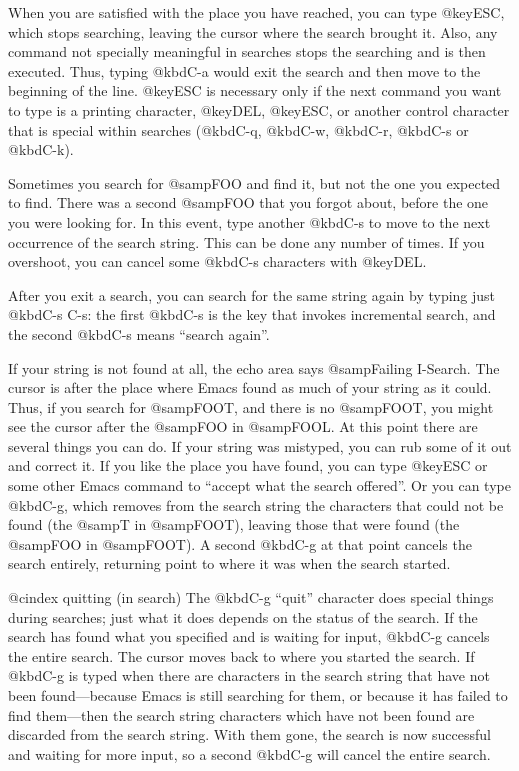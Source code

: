 {{{{{{{  When you are satisfied with the place you have reached, you can type
@key{ESC}, which stops searching, leaving the cursor where the search
brought it.  Also, any command not specially meaningful in searches stops
the searching and is then executed.  Thus, typing @kbd{C-a} would exit the
search and then move to the beginning of the line.  @key{ESC} is necessary
only if the next command you want to type is a printing character,
@key{DEL}, @key{ESC}, or another control character that is special within
searches (@kbd{C-q}, @kbd{C-w}, @kbd{C-r}, @kbd{C-s} or @kbd{C-k}).

  Sometimes you search for @samp{FOO} and find it, but not the one you
expected to find.  There was a second @samp{FOO} that you forgot about,
before the one you were looking for.  In this event, type another @kbd{C-s}
to move to the next occurrence of the search string.  This can be done any
number of times.  If you overshoot, you can cancel some @kbd{C-s}
characters with @key{DEL}.

  After you exit a search, you can search for the same string again by
typing just @kbd{C-s C-s}: the first @kbd{C-s} is the key that invokes
incremental search, and the second @kbd{C-s} means ``search again''.

  If your string is not found at all, the echo area says @samp{Failing
I-Search}.  The cursor is after the place where Emacs found as much of your
string as it could.  Thus, if you search for @samp{FOOT}, and there is no
@samp{FOOT}, you might see the cursor after the @samp{FOO} in @samp{FOOL}.
At this point there are several things you can do.  If your string was
mistyped, you can rub some of it out and correct it.  If you like the place
you have found, you can type @key{ESC} or some other Emacs command to
``accept what the search offered''.  Or you can type @kbd{C-g}, which
removes from the search string the characters that could not be found (the
@samp{T} in @samp{FOOT}), leaving those that were found (the @samp{FOO} in
@samp{FOOT}).  A second @kbd{C-g} at that point cancels the search
entirely, returning point to where it was when the search started.

@cindex quitting (in search)
  The @kbd{C-g} ``quit'' character does special things during searches;
just what it does depends on the status of the search.  If the search has
found what you specified and is waiting for input, @kbd{C-g} cancels the
entire search.  The cursor moves back to where you started the search.  If
@kbd{C-g} is typed when there are characters in the search string that have
not been found---because Emacs is still searching for them, or because it
has failed to find them---then the search string characters which have not
been found are discarded from the search string.  With them gone, the
search is now successful and waiting for more input, so a second @kbd{C-g}
will cancel the entire search.

}}}}}}}

